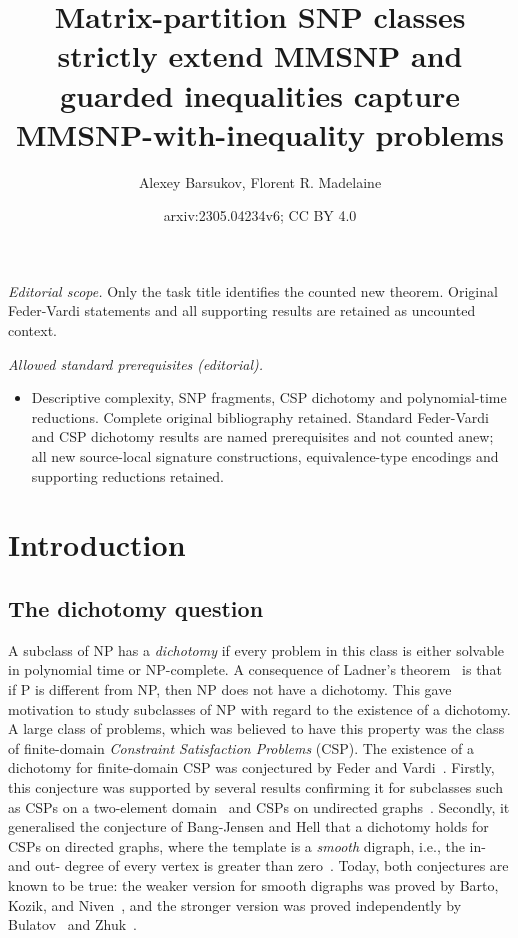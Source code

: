 \documentclass[10pt,a4paper]{amsart}
\title{Matrix-partition SNP classes strictly extend MMSNP and guarded inequalities capture MMSNP-with-inequality problems}
\author{Alexey Barsukov, Florent R. Madelaine}
\date{arxiv:2305.04234v6; CC BY 4.0}
\theoremstyle{plain}
\theoremstyle{definition}
\numberwithin{equation}{section}
\begin{document}
\maketitle
\noindent\textit{Editorial scope.} Only the task title identifies the counted new theorem. Original Feder-Vardi statements and all supporting results are retained as uncounted context.\par\medskip
\noindent\textit{Allowed standard prerequisites (editorial).}\begin{itemize}
\item Descriptive complexity, SNP fragments, CSP dichotomy and polynomial-time reductions. Complete original bibliography retained. Standard Feder-Vardi and CSP dichotomy results are named prerequisites and not counted anew; all new source-local signature constructions, equivalence-type encodings and supporting reductions retained.
\end{itemize}\medskip
\section{Introduction}





\subsection{The dichotomy question}

A subclass of NP has a \emph{dichotomy} if every problem in this class is either solvable in polynomial time or NP-complete.
%
A consequence of Ladner's theorem~\cite{ladner1975} is that if P is different from NP, then NP does not have a dichotomy.
%
This gave motivation to study subclasses of NP with regard to the existence of a dichotomy.
%
A large class of problems, which was believed to have this property was the class of finite-domain \emph{Constraint Satisfaction Problems} (CSP).
%
The existence of a dichotomy for finite-domain CSP was conjectured by Feder and Vardi~\cite{federvardi1998}.
%
Firstly, this conjecture was supported by several results confirming it for subclasses such as CSPs on a two-element domain~\cite{schaefer1978} and CSPs on undirected graphs~\cite{hellnesetril1990}.
%
Secondly, it generalised the conjecture of Bang-Jensen and Hell that a dichotomy holds for CSPs on directed graphs, where the template is a \emph{smooth} digraph, i.e., the in- and out- degree of every vertex is greater than zero~\cite{bangjensen_hell1990}.
%
Today, both conjectures are known to be true: the weaker version for smooth digraphs was proved by Barto, Kozik, and Niven~\cite{barto_kozik_niven2009}, and the stronger version was proved independently by Bulatov~\cite{bulatov2017} and Zhuk~\cite{zhuk2020}.
%
\end{document}
